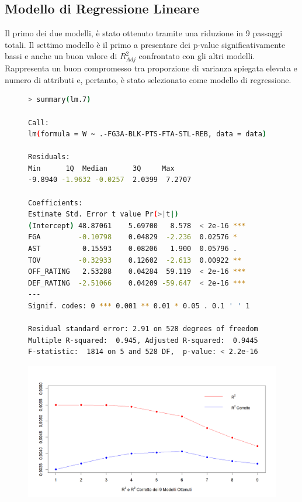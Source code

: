 \documentclass[11pt,a4paper]{article}
\begin{document}
\subsection{Modello di Regressione Lineare}
Il primo dei due modelli, è stato ottenuto tramite una riduzione in 9 passaggi totali.
Il settimo modello è il primo a presentare dei p-value significativamente bassi e anche un buon valore di $R^2_{Adj}$ confrontato con gli altri modelli. Rappresenta un buon compromesso tra proporzione di varianza spiegata elevata e numero di attributi e, pertanto, è stato selezionato come modello di regressione.

\begin{figure}[h]
	\hspace{-2.30cm}
	\begin{minipage}{.57\textwidth} 
		\begin{lstlisting}[language=bash,basicstyle=\tiny,tabsize=2,frame = single]
> summary(lm.7)
            
Call:
lm(formula = W ~ .-FG3A-BLK-PTS-FTA-STL-REB, data = data)
            
Residuals:
Min      1Q  Median      3Q     Max 
-9.8940 -1.9632 -0.0257  2.0399  7.2707 
            
Coefficients:
Estimate Std. Error t value Pr(>|t|)    
(Intercept) 48.87061    5.69700   8.578  < 2e-16 ***
FGA         -0.10798    0.04829  -2.236  0.02576 *  
AST          0.15593    0.08206   1.900  0.05796 .  
TOV         -0.32933    0.12602  -2.613  0.00922 ** 
OFF_RATING   2.53288    0.04284  59.119  < 2e-16 ***
DEF_RATING  -2.51066    0.04209 -59.647  < 2e-16 ***
---
Signif. codes: 0 *** 0.001 ** 0.01 * 0.05 . 0.1 ' ' 1
            
Residual standard error: 2.91 on 528 degrees of freedom
Multiple R-squared:  0.945,	Adjusted R-squared:  0.9445 
F-statistic:  1814 on 5 and 528 DF,  p-value: < 2.2e-16
    \end{lstlisting}
\end{minipage}
	\begin{minipage}{0.5\textwidth} 
		\includegraphics[scale=.45]{imgs/r2_linear_model.png}
	\end{minipage}
\end{figure}
\end{document}
